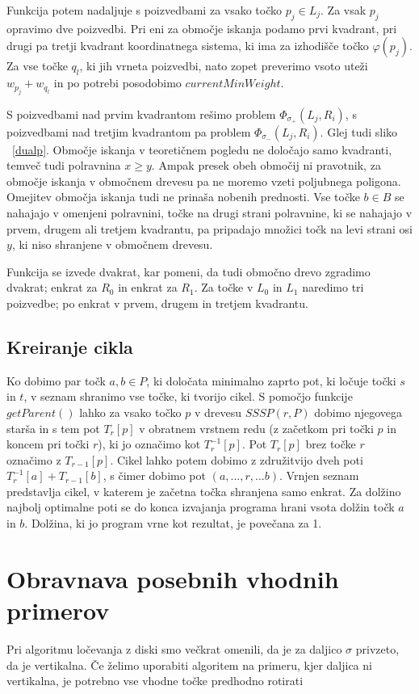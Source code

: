 \documentclass[a4paper, 12pt]{book}
\begin{document}
Funkcija potem nadaljuje s poizvedbami za vsako točko $p_j\in L_j$. Za vsak $p_j$ opravimo dve poizvedbi. Pri eni za območje iskanja podamo prvi kvadrant, pri drugi pa tretji kvadrant koordinatnega sistema, ki ima za izhodišče točko $\varphi (p_j)$. Za vse točke $q_l$, ki jih vrneta poizvedbi, nato zopet preverimo vsoto uteži $w_{p_j} + w_{q_l}$ in po potrebi posodobimo $currentMinWeight$.

S poizvedbami nad prvim kvadrantom rešimo problem $\Phi_{\sigma_+}(L_j,R_i)$, s poizvedbami nad tretjim kvadrantom pa problem $\Phi_{\sigma_-}(L_j,R_i)$. Glej tudi sliko ~\ref{dualp}. Območje iskanja v teoretičnem pogledu ne določajo samo kvadranti, temveč tudi polravnina $x \geq y$. Ampak presek obeh območij ni pravotnik, za območje iskanja v območnem drevesu pa ne moremo vzeti poljubnega poligona. Omejitev območja iskanja tudi ne prinaša nobenih prednosti. Vse točke $b\in B$ se nahajajo v omenjeni polravnini, točke na drugi strani polravnine, ki se nahajajo v prvem, drugem ali tretjem kvadrantu, pa pripadajo množici točk na levi strani osi $y$, ki niso shranjene v območnem drevesu.

Funkcija se izvede dvakrat, kar pomeni, da tudi območno drevo zgradimo dvakrat; enkrat za $R_0$ in enkrat za $R_1$. Za točke v $L_0$ in $L_1$ naredimo tri poizvedbe; po enkrat v prvem, drugem in tretjem kvadrantu.

\subsection{Kreiranje cikla}
Ko dobimo par točk $a, b\in P$, ki določata minimalno zaprto pot, ki ločuje točki $s$ in $t$, v seznam shranimo vse točke, ki tvorijo cikel. S pomočjo funkcije $getParent()$ lahko za vsako točko $p$ v drevesu $SSSP(r, P)$ dobimo njegovega starša in s tem pot $T_r[p]$ v obratnem vrstnem redu (z začetkom pri točki $p$ in koncem pri točki $r$), ki jo označimo kot $T_r^{-1}[p]$. Pot $T_r[p]$ brez točke $r$ označimo z $T_{r-1}[p]$. Cikel lahko potem dobimo z združitvijo dveh poti $T_r^{-1}[a] + T_{r-1}[b]$, s čimer dobimo pot $(a,...,r,...b)$. Vrnjen seznam predstavlja cikel, v katerem je začetna točka shranjena samo enkrat. Za dolžino najbolj optimalne poti se do konca izvajanja programa hrani vsota dolžin točk $a$ in $b$. Dolžina, ki jo program vrne kot rezultat, je povečana za 1.

\section{Obravnava posebnih vhodnih primerov}
Pri algoritmu ločevanja z diski smo večkrat omenili, da je za daljico $\sigma$ privzeto, da je vertikalna. Če želimo uporabiti algoritem na primeru, kjer daljica ni vertikalna, je potrebno vse vhodne točke predhodno rotirati 
\end{document}
